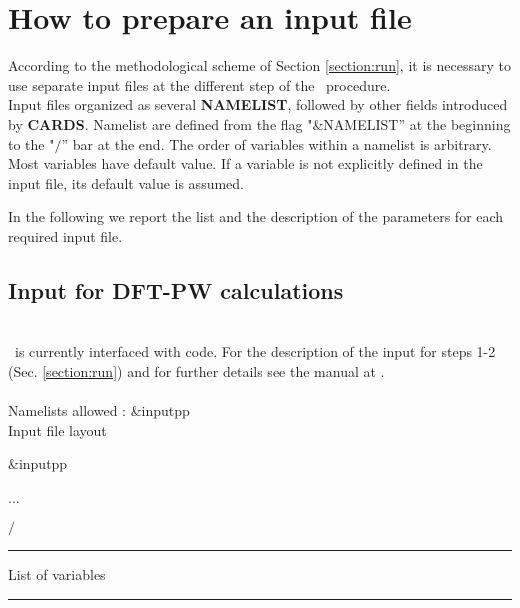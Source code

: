 
\thispagestyle{empty}
\section{How to prepare an input file}\label{section:input}

\noindent According to the methodological scheme of Section
\ref{section:run}, it is necessary to use separate input files at
the different step of the \WANT\ procedure.\\

\noindent Input files organized  as several {\bf NAMELIST},
followed by other fields introduced by {\bf CARDS}. Namelist are
defined from the  flag "\&NAMELIST'' at the beginning to the
"$/$'' bar at the end. The order of variables within a namelist is
arbitrary. Most variables have default value. If a variable is not
explicitly defined in the input file, its default value is
assumed.

\noindent In the following we report the list and the description
of the parameters for each required input file.

\subsection{Input for DFT-PW calculations}
\\
\noindent \WANT\ is currently interfaced with \PWSCF code. For the
description of the input for steps 1-2 (Sec. \ref{section:run})
and for further details see the \PWSCF manual at \PWSCFURL .\\

\\
\noindent Namelists allowed : \&inputpp\\
\noindent Input file layout
\begin{description}
  \item \&inputpp
  \item ...
  \item $/$
\end{description}
\begin{centering}
\rule{2.5in}{0.01in} List of variables \rule{2.5in}{0.01in}
\end{centering}\\

